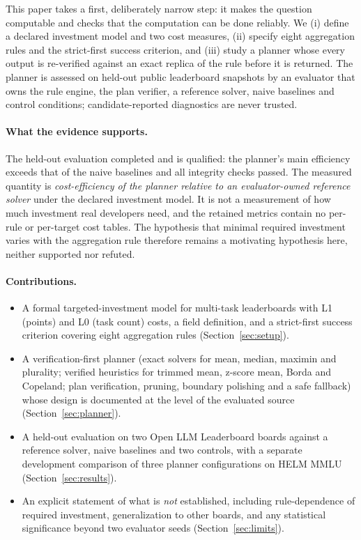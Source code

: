 \documentclass{article}
\begin{document}
This paper takes a first, deliberately narrow step: it makes the question computable and checks that the computation can be done reliably. We (i) define a declared investment model and two cost measures, (ii) specify eight aggregation rules and the strict-first success criterion, and (iii) study a planner whose every output is re-verified against an exact replica of the rule before it is returned. The planner is assessed on held-out public leaderboard snapshots by an evaluator that owns the rule engine, the plan verifier, a reference solver, naive baselines and control conditions; candidate-reported diagnostics are never trusted.

\paragraph{What the evidence supports.} The held-out evaluation completed and is qualified: the planner's main efficiency exceeds that of the naive baselines and all integrity checks passed. The measured quantity is \emph{cost-efficiency of the planner relative to an evaluator-owned reference solver} under the declared investment model. It is not a measurement of how much investment real developers need, and the retained metrics contain no per-rule or per-target cost tables. The hypothesis that minimal required investment varies with the aggregation rule therefore remains a motivating hypothesis here, neither supported nor refuted.

\paragraph{Contributions.}
\begin{itemize}
\item A formal targeted-investment model for multi-task leaderboards with L1 (points) and L0 (task count) costs, a field definition, and a strict-first success criterion covering eight aggregation rules (Section~\ref{sec:setup}).
\item A verification-first planner (exact solvers for mean, median, maximin and plurality; verified heuristics for trimmed mean, z-score mean, Borda and Copeland; plan verification, pruning, boundary polishing and a safe fallback) whose design is documented at the level of the evaluated source (Section~\ref{sec:planner}).
\item A held-out evaluation on two Open LLM Leaderboard boards against a reference solver, naive baselines and two controls, with a separate development comparison of three planner configurations on HELM MMLU (Section~\ref{sec:results}).
\item An explicit statement of what is \emph{not} established, including rule-dependence of required investment, generalization to other boards, and any statistical significance beyond two evaluator seeds (Section~\ref{sec:limits}).
\end{itemize}
\end{document}
